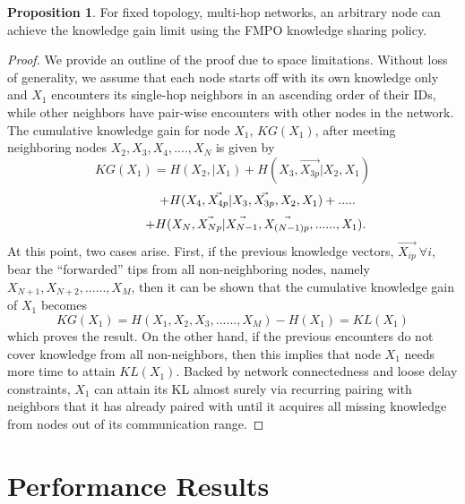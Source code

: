 \documentclass[conference]{IEEEtran}
\theoremstyle{definition}
\newtheorem{prop}{Proposition}
\begin{document}
\begin{prop}
For fixed topology, multi-hop networks, an arbitrary node can achieve the knowledge gain limit using the FMPO knowledge sharing policy.
\end{prop}
\begin{proof}
We provide an outline of the proof due to space limitations. Without loss of generality, we assume that each node starts off with its own knowledge only and $X_1$ encounters its single-hop neighbors in an ascending order of their IDs, while other neighbors have pair-wise encounters with other nodes in the network. The cumulative knowledge gain for node $X_1$, $KG(X_1)$, after meeting neighboring nodes $X_2, X_3, X_4,...., X_N$ is given by
\begin{equation}
KG(X_1)=H(X_2,|X_1) + H(X_3, \vec{X_{3p}}|X_2,X_1) 
\nonumber
\end{equation}
\begin{equation}
\hspace*{1.4 cm} + H(X_4, \vec{X_{4p}}|X_3, \vec{X_{3p}}, X_2,X_1)+.....
\nonumber
\end{equation}
\begin{equation}
\hspace*{1.3 cm} + H(X_N, \vec{X_{Np}}|\vec{X_{N-1}}, \vec{X_{(N-1)p}} ,......, X_1). 
\end{equation}
At this point, two cases arise. First, if the previous knowledge vectors, $\vec{X_{ip}}~\forall i$, bear the ``forwarded'' tips from all non-neighboring nodes, namely $X_{N+1}, X_{N+2}, ......, X_M$, then it can be shown that the cumulative knowledge gain of $X_1$ becomes
\begin{equation}
KG(X_1)=H(X_1, X_2, X_3, ......, X_M) - H(X_1)= KL(X_1) 
\end{equation} 
\noindent which proves the result. On the other hand, if the previous encounters do not cover knowledge from all non-neighbors, then this implies that node $X_1$ needs more time to attain $KL(X_1)$. Backed by network connectedness and loose delay constraints, $X_1$ can attain its KL almost surely via recurring pairing with neighbors that it has already paired with until it acquires all missing knowledge from nodes out of its communication range. 
\end{proof}


\vspace{-0.3 cm}
\section{Performance Results}
\end{document}
